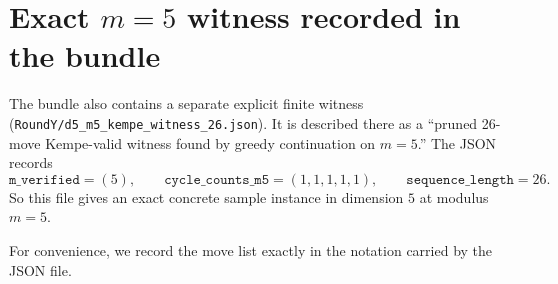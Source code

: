 \documentclass[11pt]{article}
\begin{document}
\appendix

\section{Exact $m=5$ witness recorded in the bundle}\label{app:m5witness}

The bundle also contains a separate explicit finite witness
(\texttt{RoundY/d5\_m5\_kempe\_witness\_26.json}). It is described there as a
``pruned 26-move Kempe-valid witness found by greedy continuation on $m=5$.''
The JSON records
\[
\texttt{m\_verified}=(5),
\qquad
\texttt{cycle\_counts\_m5}=(1,1,1,1,1),
\qquad
\texttt{sequence\_length}=26.
\]
So this file gives an exact concrete sample instance in dimension $5$ at modulus
$m=5$.

For convenience, we record the move list exactly in the notation carried by the
JSON file.
\end{document}
